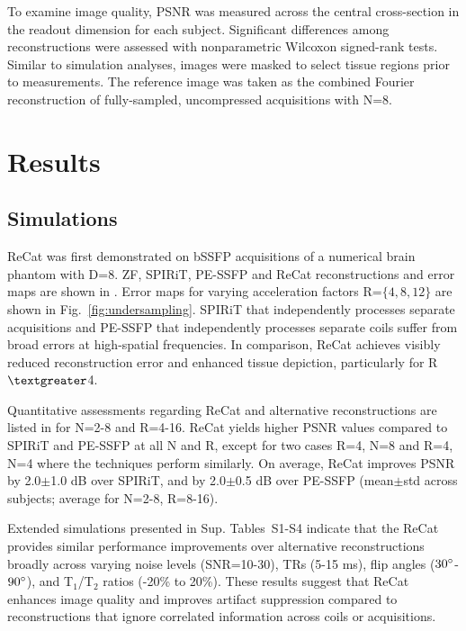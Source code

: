 \documentclass[11pt, onecolumn]{article}
\begin{document}
To examine image quality, PSNR was measured across the central cross-section in the readout dimension for each subject. Significant differences among reconstructions were assessed with nonparametric Wilcoxon signed-rank tests. Similar to simulation analyses, images were masked to select tissue regions prior to measurements. The reference image was taken as the combined Fourier reconstruction of fully-sampled, uncompressed acquisitions with N=8.  




\clearpage
\section*{Results}
\subsection*{Simulations}
ReCat was first demonstrated on bSSFP acquisitions of a numerical brain phantom with D=8. ZF, SPIRiT, PE-SSFP and ReCat reconstructions and error maps are shown in . Error maps for varying acceleration factors R=$\{4,8,12\}$ are shown in Fig.~\ref{fig:undersampling}. SPIRiT that independently processes separate acquisitions and PE-SSFP that independently processes separate coils suffer from broad errors at high-spatial frequencies. In comparison, ReCat achieves visibly reduced reconstruction error and enhanced tissue depiction, particularly for R$\textgreater$4.

Quantitative assessments regarding ReCat and alternative reconstructions are listed in  for N=2-8 and R=4-16. ReCat yields higher PSNR values compared to SPIRiT and PE-SSFP at all N and R, except for two cases R=4, N=8 and R=4, N=4 where the techniques perform similarly. On average, ReCat improves PSNR by 2.0$\pm$1.0 dB over SPIRiT, and by 2.0$\pm$0.5 dB over PE-SSFP (mean$\pm$std across subjects; average for N=2-8, R=8-16).

Extended simulations presented in Sup. Tables~S1-S4 indicate that the ReCat provides similar performance improvements over alternative reconstructions broadly across varying noise levels (SNR=10-30), TRs (5-15 ms), flip angles ($30\degree$-$90\degree$), and T$_1$/T$_2$ ratios (-20\% to 20\%). These results suggest that ReCat enhances image quality and improves artifact suppression compared to reconstructions that ignore correlated information across coils or acquisitions. 
\end{document}
